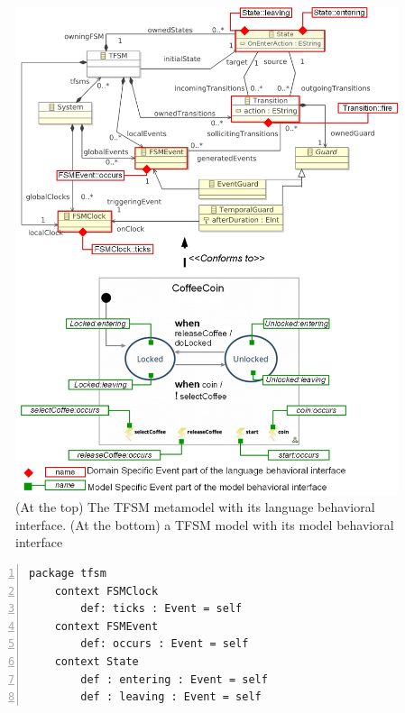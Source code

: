 	\begin{figure}
		\begin{center}
			\includegraphics[width=1\textwidth]{bcool/figs/tfsmmm.jpg}
			\caption{(At the top) The TFSM metamodel with its language behavioral interface. (At the bottom) a TFSM model with its model behavioral interface}
			\label{fig:tfsmmm}
		\end{center}
	\end{figure}
	
	\begin{lstlisting}[language=ecl,
	caption={Partial \ecl specification of TFSM},
	label={fig:tfsmmmecl}, 
	basicstyle=\scriptsize\ttfamily, backgroundcolor=\color{LGrey}, numbers=left, xleftmargin=3pt]
	package tfsm
	context FSMClock
		def: ticks : Event = self
	context FSMEvent
		def: occurs : Event = self
	context State
		def : entering : Event = self
		def : leaving : Event = self
	\end{lstlisting}
	
